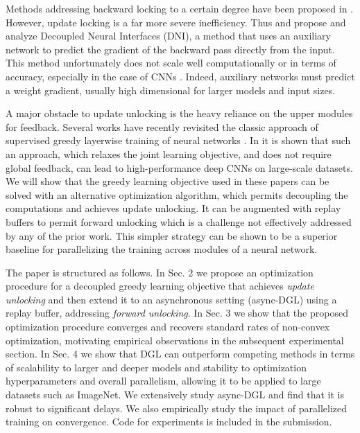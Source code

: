 \documentclass{article}
\begin{document}
Methods 
addressing backward locking to a certain degree have been proposed in \citep{ddg,Huo2018,choromanska2018beyond,direct_feedback}. However, update locking is a far more severe inefficiency. Thus \citet{jaderberg2016decoupled} and \citet{czarnecki2017} propose and analyze Decoupled Neural Interfaces (DNI), a method that
uses an auxiliary network to predict the gradient of the backward pass directly from the input. This method
unfortunately does not scale well computationally or in terms of accuracy, especially in the case of CNNs \citep{Huo2018,ddg}. Indeed, auxiliary networks must predict a  weight gradient, usually high dimensional for larger models and input sizes.

A major 
obstacle to
update unlocking 
is the heavy reliance on
the upper modules for feedback.
Several works have recently revisited the classic \citep{ivakhnenko,bengio2007greedy} approach of supervised greedy layerwise training of neural networks \citep{huang2017learning,Marquez}. In \citet{shallow}  it is shown that such an approach, which relaxes the joint learning objective, and does not require global feedback, can lead to high-performance deep CNNs on large-scale datasets. %
We will show that the greedy learning objective used in these papers can be solved with an alternative optimization algorithm, which permits decoupling the computations and 
achieves update unlocking. It can be augmented with replay buffers \citep{lin1992self} to permit 
forward unlocking which is a challenge not effectively addressed by any of the prior work. This simpler strategy can be shown to be a superior baseline for parallelizing the training across modules of a neural network.

 The paper is structured as follows. In Sec. 2 we propose an optimization procedure for a decoupled greedy learning objective that achieves \textit{update unlocking} and then extend it to an asynchronous setting (async-DGL) using a replay buffer, addressing \textit{forward unlocking}. In Sec. 3 we show that the proposed optimization procedure converges and recovers standard rates of non-convex optimization, motivating empirical observations in the subsequent experimental section. In Sec. 4 we  show that DGL can outperform competing methods in terms of scalability to larger and deeper models and stability to optimization hyperparameters and overall parallelism, allowing it to be applied to large datasets such as ImageNet. We extensively study async-DGL and find that it is robust to significant delays. We also empirically study the impact of parallelized training on convergence. Code for experiments is included in the submission.
 \vspace{-4pt}
 
\end{document}
